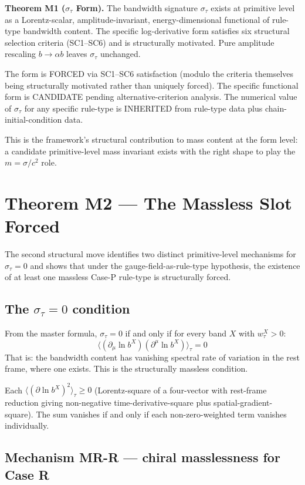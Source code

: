 \documentclass[11pt,a4paper]{article}
\begin{document}
\textbf{Theorem M1 ($\sigma_\tau$ Form).} The bandwidth signature $\sigma_\tau$ exists at primitive level as a Lorentz-scalar, amplitude-invariant, energy-dimensional functional of rule-type bandwidth content. The specific log-derivative form satisfies six structural selection criteria (SC1--SC6) and is structurally motivated. Pure amplitude rescaling $b \to \alpha b$ leaves $\sigma_\tau$ unchanged.

The form is FORCED via SC1--SC6 satisfaction (modulo the criteria themselves being structurally motivated rather than uniquely forced). The specific functional form is CANDIDATE pending alternative-criterion analysis. The numerical value of $\sigma_\tau$ for any specific rule-type is INHERITED from rule-type data plus chain-initial-condition data.

This is the framework's structural contribution to mass content at the form level: a candidate primitive-level mass invariant exists with the right shape to play the $m = \sigma/c^2$ role.

\section{Theorem M2 --- The Massless Slot Forced}

The second structural move identifies two distinct primitive-level mechanisms for $\sigma_\tau = 0$ and shows that under the gauge-field-as-rule-type hypothesis, the existence of at least one massless Case-P rule-type is structurally forced.

\subsection{The $\sigma_\tau = 0$ condition}

From the master formula, $\sigma_\tau = 0$ if and only if for every band $X$ with $w_\tau^X > 0$:
\[
\langle(\partial_\mu \ln b^X)(\partial^\mu \ln b^X)\rangle_\tau = 0
\]
That is: the bandwidth content has vanishing spectral rate of variation in the rest frame, where one exists. This is the structurally massless condition.

Each $\langle(\partial\ln b^X)^2\rangle_\tau \geq 0$ (Lorentz-square of a four-vector with rest-frame reduction giving non-negative time-derivative-square plus spatial-gradient-square). The sum vanishes if and only if each non-zero-weighted term vanishes individually.

\subsection{Mechanism MR-R --- chiral masslessness for Case R}
\end{document}
